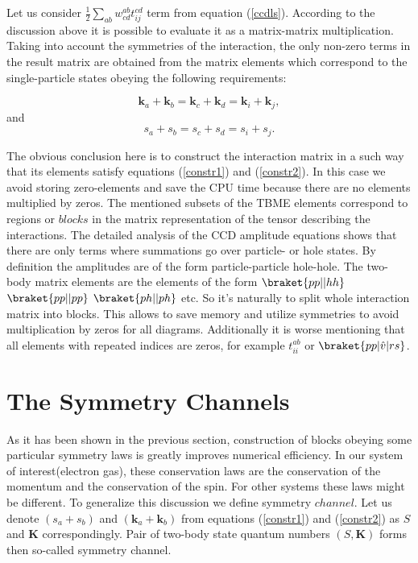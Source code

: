 \documentclass[twoside,english]{uiofysmaster}
\begin{document}
Let us consider $ \frac{1}{2}\sum_{ab}w_{cd}^{ab}t_{ij}^{cd}$ term from equation (\ref{ccdls}). According to the discussion above it is possible to evaluate it as a matrix-matrix multiplication. Taking into account the symmetries of the interaction, the only non-zero terms in the result matrix are obtained from the matrix elements which correspond to the single-particle states obeying the following requirements:

\begin{equation}\label{constr1}
	\boldsymbol{k}_a + \boldsymbol{k}_b = \boldsymbol{k}_c + \boldsymbol{k}_d = \boldsymbol{k}_i + \boldsymbol{k}_j,
\end{equation}
and
\begin{equation}\label{constr2}
s_a + s_b = s_c + s_d = s_i + s_j.
\end{equation}

The obvious conclusion here is to construct the interaction matrix in a such way that its elements satisfy equations (\ref{constr1}) and (\ref{constr2}). In this case we avoid storing zero-elements and save the CPU time because there are no elements multiplied by zeros. The mentioned subsets of the TBME elements correspond to regions or $blocks$ in the matrix representation of the tensor describing the interactions.
The detailed analysis of the CCD amplitude equations shows that there are only terms where summations go over particle- or hole states. By definition the amplitudes are of the form particle-particle hole-hole. The two-body matrix elements are the elements of the form $\braket{pp||hh}$ $\braket{pp||pp}$ $\braket{ph||ph}$ etc. So it's naturally to split whole interaction matrix into blocks. This allows to save memory and utilize symmetries to avoid multiplication by zeros for all diagrams.
Additionally it is worse mentioning that all elements with repeated indices are zeros, for example $t_{ii}^{ab}$ or $\braket{pp|\hat{v}|rs}$.


\section{The Symmetry Channels}\label{sectionSymmetryChan}
As it has been shown in the previous section, construction of blocks obeying some particular symmetry laws is greatly improves numerical efficiency. In our system of interest(electron gas), these conservation laws are the conservation of the momentum and the conservation of the spin. For other systems these laws might be different. To generalize this discussion we define symmetry $channel$. Let us denote $(s_a + s_b)$ and $(\boldsymbol{k}_a + \boldsymbol{k}_b)$ from equations (\ref{constr1}) and (\ref{constr2}) as $S$ and $\boldsymbol{K}$ correspondingly. Pair of two-body state quantum numbers $(S, \boldsymbol{K})$ forms then so-called symmetry channel.
\end{document}
